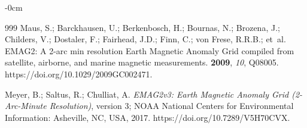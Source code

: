 \documentclass[minerals,article,accept,pdftex,moreauthors]{Definitions/mdpi}
\begin{document}
\begin{adjustwidth}{-\extralength}{0cm}
\begin{thebibliography}{999}
Maus, S.; Barckhausen, U.; Berkenbosch, H.; Bournas, N.; Brozena, J.; Childers,
  V.; Dostaler, F.; Fairhead, J.D.; Finn, C.; von Frese, R.R.B.;  et~al.
\newblock EMAG2: A 2-arc min resolution Earth Magnetic Anomaly Grid compiled
  from satellite, airborne, and marine magnetic measurements.
 {\bf 2009}, {\em 10}, Q08005.
\newblock https://doi.org/10.1029/2009GC002471.

Meyer, B.; Saltus, R.; Chulliat, A.
\newblock \emph{EMAG2v3: Earth Magnetic Anomaly Grid (2-Arc-Minute Resolution)},
  version 3;
\newblock NOAA National Centers for Environmental Information: Asheville, NC, USA, 2017. %
  https://doi.org/10.7289/V5H70CVX.

\end{thebibliography}


\PublishersNote{}
\end{adjustwidth}
\end{document}
